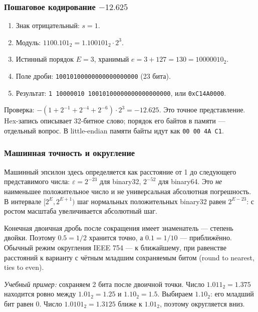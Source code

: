\subsubsection*{Пошаговое кодирование $-12.625$}
\begin{enumerate}
    \item Знак отрицательный: $s=1$.
    \item Модуль: $1100.101_2=1.100101_2\cdot2^3$.
    \item Истинный порядок $E=3$, хранимый $e=3+127=130=10000010_2$.
    \item Поле дроби: \texttt{10010100000000000000000} (23 бита).
    \item Результат: \texttt{1 10000010 10010100000000000000000},
    или \texttt{0xC14A0000}.
\end{enumerate}
Проверка: $-(1+2^{-1}+2^{-4}+2^{-6})\cdot2^3=-12.625$.
Это точное представление. Hex-запись описывает 32-битное слово;
порядок его байтов в памяти --- отдельный вопрос. В little-endian
памяти байты идут как \texttt{00 00 4A C1}.

\subsubsection*{Машинная точность и округление}
Машинный эпсилон здесь определяется как расстояние от 1 до следующего
представимого числа: $\varepsilon=2^{-23}$ для binary32,
$2^{-52}$ для binary64. Это \emph{не} наименьшее положительное число
и не универсальная абсолютная погрешность.
В интервале $[2^E,2^{E+1})$ шаг нормальных положительных binary32
равен $2^{E-23}$: с ростом масштаба увеличивается абсолютный шаг.

Конечная двоичная дробь после сокращения имеет знаменатель --- степень
двойки. Поэтому $0.5=1/2$ хранится точно, а $0.1=1/10$ --- приближённо.
Обычный режим округления IEEE 754 --- к ближайшему, при равенстве
расстояний к варианту с чётным младшим сохраняемым битом
(round to nearest, ties to even).

\textit{Учебный пример:} сохраняем 2 бита после двоичной точки.
Число $1.011_2=1.375$ находится ровно между $1.01_2=1.25$ и
$1.10_2=1.5$. Выбираем $1.10_2$: его младший бит равен 0.
Число $1.0101_2=1.3125$ ближе к $1.01_2$, поэтому округляется вниз.

